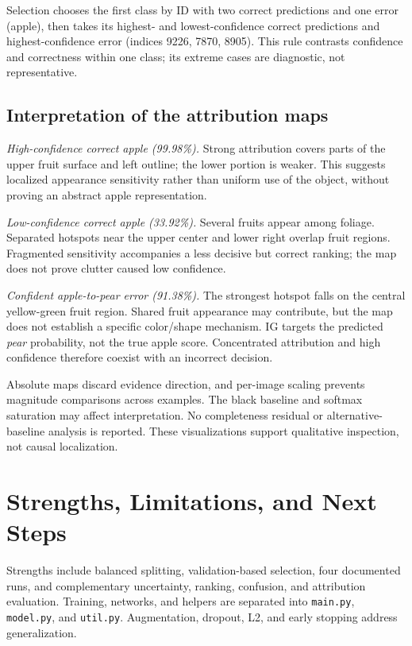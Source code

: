 \documentclass[conference]{IEEEtran}
\begin{document}
Selection chooses the first class by ID with two correct predictions and one error (apple), then takes its highest- and lowest-confidence correct predictions and highest-confidence error (indices 9226, 7870, 8905). This rule contrasts confidence and correctness within one class; its extreme cases are diagnostic, not representative.

\subsection{Interpretation of the attribution maps}
\textit{High-confidence correct apple (99.98\%).} Strong attribution covers parts of the upper fruit surface and left outline; the lower portion is weaker. This suggests localized appearance sensitivity rather than uniform use of the object, without proving an abstract apple representation.

\textit{Low-confidence correct apple (33.92\%).} Several fruits appear among foliage. Separated hotspots near the upper center and lower right overlap fruit regions. Fragmented sensitivity accompanies a less decisive but correct ranking; the map does not prove clutter caused low confidence.

\textit{Confident apple-to-pear error (91.38\%).} The strongest hotspot falls on the central yellow-green fruit region. Shared fruit appearance may contribute, but the map does not establish a specific color/shape mechanism. IG targets the predicted \emph{pear} probability, not the true apple score. Concentrated attribution and high confidence therefore coexist with an incorrect decision.

Absolute maps discard evidence direction, and per-image scaling prevents magnitude comparisons across examples. The black baseline and softmax saturation may affect interpretation. No completeness residual or alternative-baseline analysis is reported. These visualizations support qualitative inspection, not causal localization.

\section{Strengths, Limitations, and Next Steps}
Strengths include balanced splitting, validation-based selection, four documented runs, and complementary uncertainty, ranking, confusion, and attribution evaluation. Training, networks, and helpers are separated into \texttt{main.py}, \texttt{model.py}, and \texttt{util.py}. Augmentation, dropout, L2, and early stopping address generalization.
\end{document}
